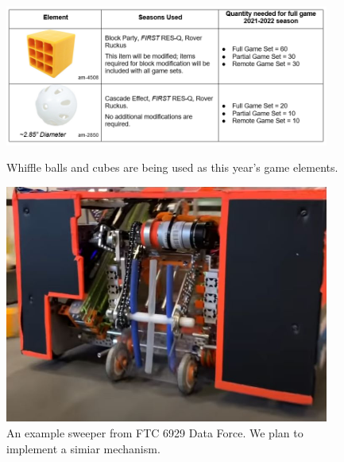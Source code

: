 \begin{figure}[ht]
\centering
\begin{minipage}[b]{.48\textwidth}
  \centering
  \includegraphics[width=0.95\textwidth]{Meetings/August/08-20-21/8-18-21_CAD_Image1 - Nathan Forrer.png}
  \caption{Whiffle balls and cubes are being used as this year's game elements.}
  \label{fig:pic1}
\end{minipage}%
\hfill%
\begin{minipage}[b]{.48\textwidth}
  \centering
  \includegraphics[width=0.95\textwidth]{Meetings/August/08-20-21/8-18-21_CAD_Image2 - Nathan Forrer.jpg}
  \caption{An example sweeper from FTC 6929 Data Force. We plan to implement a simiar mechanism.}
  \label{fig:pic2}
\end{minipage}
\end{figure}

